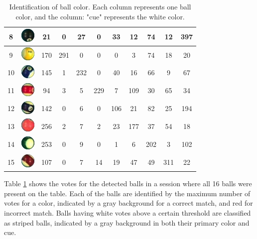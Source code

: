 \begin{table}[htpb]
\begin{center}
\begin{tabular}{|c|c|c|c|c|c|c|c|c|c|c|}
		\hline
		8 &\includegraphics[]{images/ballsInVotes/8} & 21 & 0 & 27 & 0 & 33 & 12 & 74 & 12 & \cellcolor{gray}397\\
		\hline
		9 &\includegraphics[]{images/ballsInVotes/9} & \cellcolor{gray}170 & \cellcolor{gray}291 & 0 & 0 & 0 & 3 & 74 & 18 & 20\\
		\hline
		10 &\includegraphics[]{images/ballsInVotes/10} & \cellcolor{gray}145 & 1 & \cellcolor{gray}232 & 0 & 40 & 16 & 66 & 9 & 67\\
		\hline
		11 &\includegraphics[]{images/ballsInVotes/11} & \cellcolor{gray}94 & 3 & 5 & \cellcolor{gray}229 & 7 & 109 & 30 & 65 & 34\\
		\hline
		12 &\includegraphics[]{images/ballsInVotes/12} & \cellcolor{gray}142 & 0 & 6 & 0 & 106 & 21 & 82 & 25 & \cellcolor{red}194\\
		\hline
		13 &\includegraphics[]{images/ballsInVotes/13} & \cellcolor{gray}256 & 2 & 7 & 2 & 23 & \cellcolor{gray}177 & 37 & 54 & 18 \\
		\hline
		14 &\includegraphics[]{images/ballsInVotes/14} & \cellcolor{gray}253 & 0 & 9 & 0 & 1 & 6 & \cellcolor{gray}202 & 3 & 102\\
		\hline
		15 &\includegraphics[]{images/ballsInVotes/15} & \cellcolor{gray}107 & 0 & 7 & 14 & 19 & 47 & 49 & \cellcolor{gray}311 & 22\\
		\hline
	\end{tabular}
\end{center}
	\caption{Identification of ball color. Each column represents one ball color, and the column: "cue" represents the white color.}
	\label{table:ballvote}
\end{table}
Table \ref{table:ballvote} shows the votes for the detected balls in a session where all 16 balls were present on the table. Each of the balls are identified by the maximum number of votes for a color, indicated by a gray background for a correct match, and red for incorrect match. Balls having white votes above a certain threshold are classified as striped balls, indicated by a gray background in both their primary color and cue.

